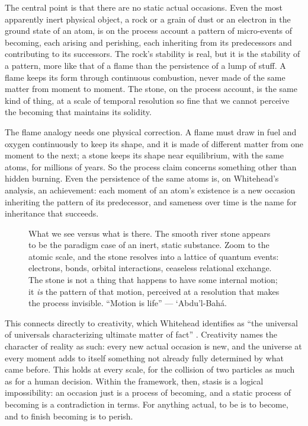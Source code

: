 The central point is that there are no static actual occasions. Even the most apparently inert physical object, a rock or a grain of dust or an electron in the ground state of an atom, is on the process account a pattern of micro-events of becoming, each arising and perishing, each inheriting from its predecessors and contributing to its successors. The rock's stability is real, but it is the stability of a pattern, more like that of a flame than the persistence of a lump of stuff. A flame keeps its form through continuous combustion, never made of the same matter from moment to moment. The stone, on the process account, is the same kind of thing, at a scale of temporal resolution so fine that we cannot perceive the becoming that maintains its solidity.

The flame analogy needs one physical correction. A flame must draw in fuel and oxygen continuously to keep its shape, and it is made of different matter from one moment to the next; a stone keeps its shape near equilibrium, with the same atoms, for millions of years. So the process claim concerns something other than hidden burning. Even the persistence of the same atoms is, on Whitehead's analysis, an achievement: each moment of an atom's existence is a new occasion inheriting the pattern of its predecessor, and sameness over time is the name for inheritance that succeeds.

\begin{figure}[htbp]
  \centering
  \resizebox{\linewidth}{!}{}
  \caption[The stone's secret: macro stillness, atomic motion]{What we see versus what is there. The smooth river stone appears to be the paradigm case of an inert, static substance. Zoom to the atomic scale, and the stone resolves into a lattice of quantum events: electrons, bonds, orbital interactions, ceaseless relational exchange. The stone is not a thing that happens to have some internal motion; it \emph{is} the pattern of that motion, perceived at a resolution that makes the process invisible. ``Motion is life'' --- `Abdu'l-Bahá.}
  \label{fig:stone-zoom}
\end{figure}

This connects directly to creativity, which Whitehead identifies as ``the universal of universals characterizing ultimate matter of fact'' \citep[p.~21]{Whitehead1929}. Creativity names the character of reality as such: every new actual occasion is new, and the universe at every moment adds to itself something not already fully determined by what came before. This holds at every scale, for the collision of two particles as much as for a human decision. Within the framework, then, stasis is a logical impossibility: an occasion just is a process of becoming, and a static process of becoming is a contradiction in terms. For anything actual, to be is to become, and to finish becoming is to perish.

